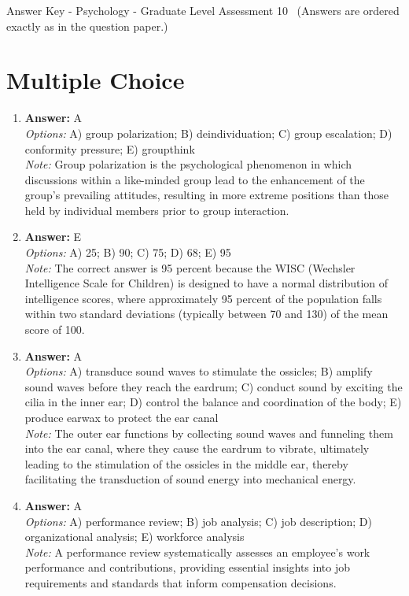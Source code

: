 \documentclass[12pt]{article}
\begin{document}
\begin{center}
Answer Key - Psychology - Graduate Level Assessment 10 \
\small (Answers are ordered exactly as in the question paper.)
\end{center}

\section*{Multiple Choice}
\begin{enumerate}[label=\arabic*.]
\item \textbf{Answer:} A
\\ \textit{Options:} A) group polarization; B) deindividuation; C) group escalation; D) conformity pressure; E) groupthink
\\ \textit{Note:} Group polarization is the psychological phenomenon in which discussions within a like-minded group lead to the enhancement of the group's prevailing attitudes, resulting in more extreme positions than those held by individual members prior to group interaction.
\item \textbf{Answer:} E
\\ \textit{Options:} A) 25; B) 90; C) 75; D) 68; E) 95
\\ \textit{Note:} The correct answer is 95 percent because the WISC (Wechsler Intelligence Scale for Children) is designed to have a normal distribution of intelligence scores, where approximately 95 percent of the population falls within two standard deviations (typically between 70 and 130) of the mean score of 100.
\item \textbf{Answer:} A
\\ \textit{Options:} A) transduce sound waves to stimulate the ossicles; B) amplify sound waves before they reach the eardrum; C) conduct sound by exciting the cilia in the inner ear; D) control the balance and coordination of the body; E) produce earwax to protect the ear canal
\\ \textit{Note:} The outer ear functions by collecting sound waves and funneling them into the ear canal, where they cause the eardrum to vibrate, ultimately leading to the stimulation of the ossicles in the middle ear, thereby facilitating the transduction of sound energy into mechanical energy.
\item \textbf{Answer:} A
\\ \textit{Options:} A) performance review; B) job analysis; C) job description; D) organizational analysis; E) workforce analysis
\\ \textit{Note:} A performance review systematically assesses an employee's work performance and contributions, providing essential insights into job requirements and standards that inform compensation decisions.

\end{enumerate}
\end{document}
